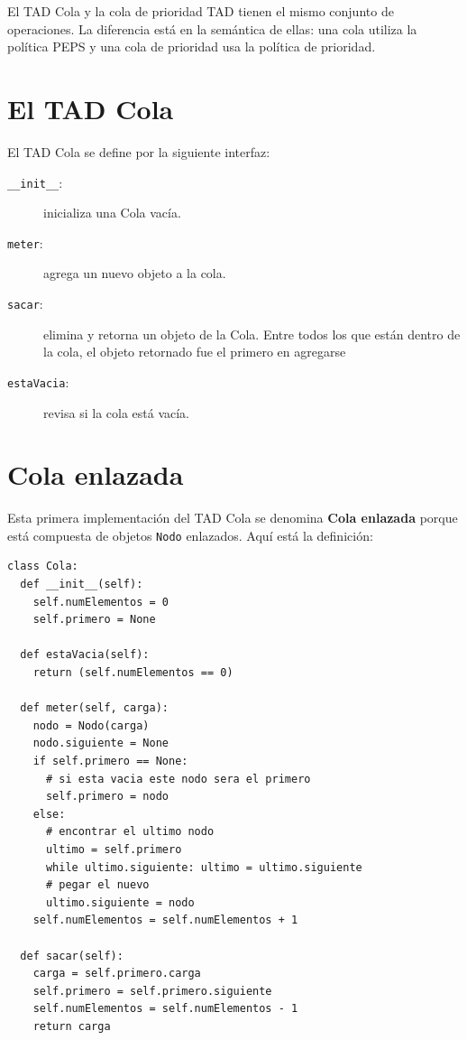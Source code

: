 El TAD Cola y la cola de prioridad TAD tienen el mismo conjunto de 
operaciones. La diferencia está en la semántica de ellas: una cola
utiliza la política PEPS y una cola de prioridad  usa la política 
de  prioridad.


\section{El TAD Cola}

El TAD Cola se define por la siguiente interfaz:

\begin{description}

\item[\texttt{\_\_init\_\_}:] inicializa una Cola vacía.

\item[\texttt{meter}:] agrega un nuevo objeto a la cola.

\item[\texttt{sacar}:] elimina y retorna un objeto de la Cola.  Entre
todos los que están dentro de la cola, el objeto retornado fue el primero en
 agregarse 

\item[\texttt{estaVacia}:] revisa si la cola está vacía.

\end{description}


\section{Cola enlazada}

Esta primera implementación del TAD Cola se denomina 
 {\bf Cola enlazada} porque está compuesta de objetos 
\texttt{Nodo} enlazados.  Aquí está la definición:

\beforeverb
\begin{verbatim}
class Cola:
  def __init__(self):
    self.numElementos = 0
    self.primero = None

  def estaVacia(self):
    return (self.numElementos == 0)

  def meter(self, carga):
    nodo = Nodo(carga)
    nodo.siguiente = None
    if self.primero == None:
      # si esta vacia este nodo sera el primero
      self.primero = nodo
    else:
      # encontrar el ultimo nodo
      ultimo = self.primero
      while ultimo.siguiente: ultimo = ultimo.siguiente
      # pegar el nuevo
      ultimo.siguiente = nodo
    self.numElementos = self.numElementos + 1

  def sacar(self):
    carga = self.primero.carga
    self.primero = self.primero.siguiente
    self.numElementos = self.numElementos - 1
    return carga
\end{verbatim}
\afterverb
%

